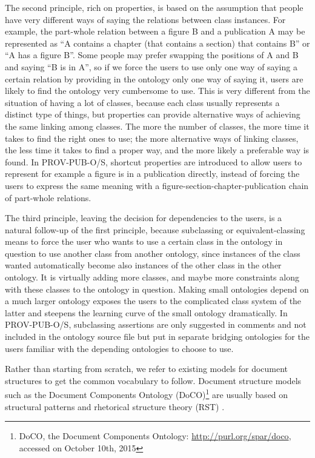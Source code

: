 The second principle, rich on properties, is based on the assumption that people have very different ways of saying the relations between class instances. For example, the part-whole relation between a figure B and a publication A may be represented as ``A contains a chapter (that contains a section) that contains B'' or ``A has a figure B''. Some people may prefer swapping the positions of A and B and saying ``B is in A'', so if we force the users to use only one way of saying a certain relation by providing in the ontology only one way of saying it, users are likely to find the ontology very cumbersome to use. This is very different from the situation of having a lot of classes, because each class usually represents a distinct type of things, but properties can provide alternative ways of achieving the same linking among classes. The more the number of classes, the more time it takes to find the right ones to use; the more alternative ways of linking classes, the less time it takes to find a proper way, and the more likely a preferable way is found. In PROV-PUB-O/S, shortcut properties are introduced to allow users to represent for example a figure is in a publication directly, instead of forcing the users to express the same meaning with a figure-section-chapter-publication chain of part-whole relations. 

The third principle, leaving the decision for dependencies to the users, is a natural follow-up of the first principle, because subclassing or equivalent-classing means to force the user who wants to use a certain class in the ontology in question to use another class from another ontology, since instances of the class wanted automatically become also instances of the other class in the other ontology. It is virtually adding more classes, and maybe more constraints along with these classes to the ontology in question. Making small ontologies depend on a much larger ontology exposes the users to the complicated class system of the latter and steepens the learning curve of the small ontology dramatically. In PROV-PUB-O/S, subclassing assertions are only suggested in comments and not included in the ontology source file but put in separate bridging ontologies for the users familiar with the depending ontologies to choose to use.

Rather than starting from scratch, we refer to existing models for document structures to get the common vocabulary to follow. Document structure models such as the Document Components Ontology (DoCO)\footnote{DoCO, the Document Components Ontology: \url{http://purl.org/spar/doco}, accessed on October 10th, 2015} are usually based on structural patterns \cite{di2014dealing} and rhetorical structure theory (RST) \cite{taboada2006rhetorical}.

